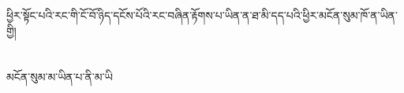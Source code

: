 ཕྱིར་སྟོང་པའི་རང་གི་ངོ་བོ་ཉིད་དངོས་པོའི་རང་བཞིན་རྟོགས་པ་ཡིན་ན་ཐ་མི་དད་པའི་ཕྱིར་མངོན་སུམ་ཁོ་ན་ཡིན་གྱི།\chapter{ }མངོན་སུམ་མ་ཡིན་པ་ནི་མ་ཡི